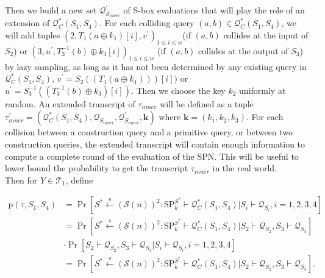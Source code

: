 Then we build a new set $\mathcal{Q}_{S_{inner}}^{\prime}$ of S-box evaluations that will play the role of an extension of $\mathcal{Q}_{C}^{*}\left(S_{1}, S_{4}\right)$. For each colliding query $(a, b) \in \mathcal{Q}_{C}^{*}\left(S_{1}, S_{4}\right)$, we will add tuples $\left(2, T_1\left(a \oplus k_{1}\right)[i], v^{\prime}\right)_{1 \leq i \leq w}$(if $(a, b)$ collides at the input of $S_2$) or $\left(3, u^{\prime}, T_{3}^{-1}\left(b\right) \oplus k_{3}[i]\right)_{1 \leq i \leq w}$ (if $(a, b)$ collides at the output of $S_3$) by lazy sampling, as long as it has not been determined by any existing query in $\mathcal{Q}_{C}^{*}\left(S_{1}, S_{4}\right)$, $v^{\prime}=S_{2}(\left(T_1\left(a \oplus k_{1}\right)\right))[i])$ or $u^{\prime}=S_{3}^{-1}(\left(T_{3}^{-1}\left(b\right) \oplus k_{3}\right)[i])$. Then we choose the key $k_2$ uniformly at random. An extended transcript of $\tau_{inner}$ will be defined as a tuple $\tau_{inner}^{\prime}=\left(\mathcal{Q}_{C}^{*}\left(S_{1}, S_{4}\right), \mathcal{Q}_{S_{inner}}, \mathcal{Q}_{S_{inner}}^{\prime}, \mathbf{k}\right)$ where $\mathbf{k}=\left(k_{1}, k_{2}, k_{3}\right)$. For each collision between a construction query and a primitive query, or between two construction queries, the extended transcript will contain enough information to compute a complete round of the evaluation of the SPN. This will be useful to lower bound the probability to get the transcript $\tau_{inner}$ in the real world.\\

Then for $Y \in \mathcal{T}_{1}$, define

\begin{equation}
\begin{aligned}
\mathrm{p}\left(\tau, S_{1}, S_{4}\right)&=\operatorname{Pr}\left[S^{*} \stackrel{\mathrm{s}}{\leftarrow}(\mathcal{S}(n))^{2}:
\mathrm{SP}_{k}^{S^{*}} \vdash \mathcal{Q}_{C}^{*}\left(S_{1}, S_{4}\right) | S_{i} \vdash \mathcal{Q}_{S_{i}}, i=1,2,3,4\right] \\
&=\operatorname{Pr}\left[S^{*} \stackrel{\mathrm{s}}{\leftarrow}(\mathcal{S}(n))^{2}: \mathrm{SP}_{k}^{S^{*}} \vdash \mathcal{Q}_{C}^{*}\left(S_{1},
S_{4}\right) | S_{2} \vdash \mathcal{Q}_{S_{2}}, S_{3} \vdash \mathcal{Q}_{S_{3}}\right] \\
& \cdot \operatorname{Pr}\left[S_{2} \vdash \mathcal{Q}_{S_{2}}, S_{3} \vdash \mathcal{Q}_{S_{3}}| S_{i} \vdash \mathcal{Q}_{S_{i}}, i=1,2,3,4\right]\\
&=\operatorname{Pr}\left[S^{*} \stackrel{\mathrm{s}}{\leftarrow}(\mathcal{S}(n))^{2}: \mathrm{SP}_{k}^{S^{*}} \vdash \mathcal{Q}_{C}^{*}\left(S_{1},
S_{4}\right) | S_{2} \vdash \mathcal{Q}_{S_{2}}, S_{3} \vdash \mathcal{Q}_{S_{3}}\right].
\end{aligned}
\end{equation}

